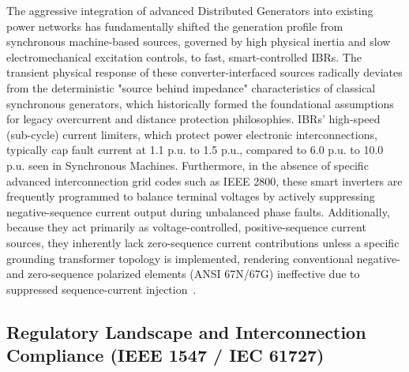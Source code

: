 The aggressive integration of advanced Distributed Generators into existing power networks has fundamentally shifted the generation profile from synchronous machine-based sources, governed by high physical inertia and slow electromechanical excitation controls, to fast, smart-controlled IBRs. The transient physical response of these converter-interfaced sources radically deviates from the deterministic "source behind impedance" characteristics of classical synchronous generators, which historically formed the foundational assumptions for legacy overcurrent and distance protection philosophies.
 IBRs' high-speed (sub-cycle) current limiters, which protect power electronic interconnections, typically cap fault current at 1.1 p.u. to 1.5 p.u., compared to 6.0 p.u. to 10.0 p.u. seen in Synchronous Machines. Furthermore, in the absence of specific advanced interconnection grid codes such as IEEE 2800, these smart inverters are frequently programmed to balance terminal voltages by actively suppressing negative-sequence current output during unbalanced phase faults. Additionally, because they act primarily as voltage-controlled, positive-sequence current sources, they inherently lack zero-sequence current contributions unless a specific grounding transformer topology is implemented, rendering conventional negative- and zero-sequence polarized elements (ANSI 67N/67G) ineffective due to suppressed sequence-current injection~\cite{sanati2024comprehensive}.


\subsection{Regulatory Landscape and Interconnection Compliance (IEEE 1547 / IEC 61727)}



